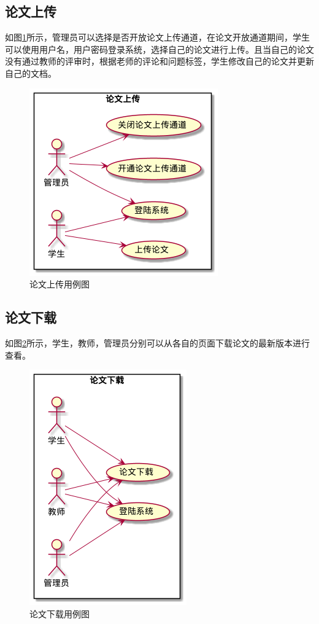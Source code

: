 \subsection{论文上传}

如图\ref{upload-usecase}所示，管理员可以选择是否开放论文上传通道，在论文开放通道期间，学生可以使用用户名，用户密码登录系统，选择自己的论文进行上传。且当自己的论文没有通过教师的评审时，根据老师的评论和问题标签，学生修改自己的论文并更新自己的文档。

\begin{figure}[H]
    \centering
    \includegraphics[scale = 0.6]{out/uml/用例图/2-论文上传/2-论文上传.png}
    \caption{\song\wuhao 论文上传用例图}
    \label{upload-usecase}
\end{figure}

\subsection{论文下载}

如图\ref{download-usecase}所示，学生，教师，管理员分别可以从各自的页面下载论文的最新版本进行查看。

\begin{figure}[H]
    \centering
    \includegraphics[scale = 0.6]{out/uml/用例图/5-论文下载/5-论文下载.png}
    \caption{\song\wuhao 论文下载用例图}
    \label{download-usecase}
\end{figure}

